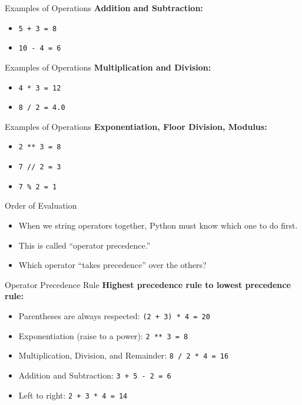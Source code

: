 \documentclass[serif, aspectratio=169]{beamer}
\begin{document}
\begin{frame}{Examples of Operations}
    \textbf{Addition and Subtraction:}
    \begin{itemize}[<+-| alert@+>]
        \item \texttt{5 + 3 = 8}
        \item \texttt{10 - 4 = 6}
    \end{itemize}
\end{frame}

\begin{frame}{Examples of Operations}
    \textbf{Multiplication and Division:}
    \begin{itemize}[<+-| alert@+>]
        \item \texttt{4 * 3 = 12}
        \item \texttt{8 / 2 = 4.0}
    \end{itemize}
\end{frame}

\begin{frame}{Examples of Operations}
    \textbf{Exponentiation, Floor Division, Modulus:}
    \begin{itemize}[<+-| alert@+>]
        \item \texttt{2 ** 3 = 8}
        \item \texttt{7 // 2 = 3}
        \item \texttt{7 \% 2 = 1}
    \end{itemize}
\end{frame}

\begin{frame}{Order of Evaluation}
    \begin{itemize}[<+-| alert@+>]
        \item When we string operators together, Python must know which one to do first.
        \item This is called “operator precedence.”
        \item Which operator “takes precedence” over the others?
    \end{itemize}
\end{frame}

\begin{frame}{Operator Precedence Rule}
    \textbf{Highest precedence rule to lowest precedence rule:}
    \begin{itemize}[<+-| alert@+>]
        \item Parentheses are always respected: \texttt{(2 + 3) * 4 = 20}
        \item Exponentiation (raise to a power): \texttt{2 ** 3 = 8}
        \item Multiplication, Division, and Remainder: \texttt{8 / 2 * 4 = 16}
        \item Addition and Subtraction: \texttt{3 + 5 - 2 = 6}
        \item Left to right: \texttt{2 + 3 * 4 = 14}
    \end{itemize}
\end{frame}
\end{document}
